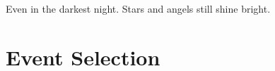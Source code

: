 \begin{savequote}[75mm]
Even in the darkest night. Stars and angels still shine bright.   
\end{savequote}

\chapter{Event Selection}
\label{sec:selection}





